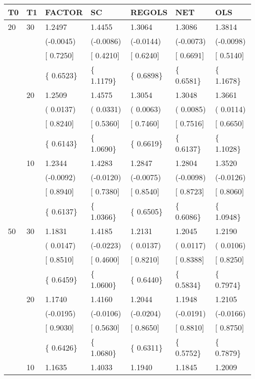 \begin{table}[ht]
\centering
\begin{tabular}{lllllll}
  \hline
T0 & T1 & FACTOR & SC & REGOLS & NET & OLS \\ 
  \hline
20 & 30 &  1.2497 &  1.4455 &  1.3064 &  1.3086 &  1.3814 \\ 
   &  & (-0.0045) & (-0.0086) & (-0.0144) & (-0.0073) & (-0.0098) \\ 
   &  & [ 0.7250] & [ 0.4210] & [ 0.6240] & [ 0.6691] & [ 0.5140] \\ 
   &  & \{ 0.6523\} & \{ 1.1179\} & \{ 0.6898\} & \{ 0.6581\} & \{ 1.1678\} \\ 
   & 20 &  1.2509 &  1.4575 &  1.3054 &  1.3048 &  1.3661 \\ 
   &  & ( 0.0137) & ( 0.0331) & ( 0.0063) & ( 0.0085) & ( 0.0114) \\ 
   &  & [ 0.8240] & [ 0.5360] & [ 0.7460] & [ 0.7516] & [ 0.6650] \\ 
   &  & \{ 0.6143\} & \{ 1.0690\} & \{ 0.6619\} & \{ 0.6137\} & \{ 1.1028\} \\ 
   & 10 &  1.2344 &  1.4283 &  1.2847 &  1.2804 &  1.3520 \\ 
   &  & (-0.0092) & (-0.0120) & (-0.0075) & (-0.0098) & (-0.0126) \\ 
   &  & [ 0.8940] & [ 0.7380] & [ 0.8540] & [ 0.8723] & [ 0.8060] \\ 
   &  & \{ 0.6137\} & \{ 1.0366\} & \{ 0.6505\} & \{ 0.6086\} & \{ 1.0948\} \\ 
  50 & 30 &  1.1831 &  1.4185 &  1.2131 &  1.2045 &  1.2190 \\ 
   &  & ( 0.0147) & (-0.0223) & ( 0.0137) & ( 0.0117) & ( 0.0106) \\ 
   &  & [ 0.8510] & [ 0.4600] & [ 0.8210] & [ 0.8388] & [ 0.8250] \\ 
   &  & \{ 0.6459\} & \{ 1.0600\} & \{ 0.6440\} & \{ 0.5834\} & \{ 0.7974\} \\ 
   & 20 &  1.1740 &  1.4160 &  1.2044 &  1.1948 &  1.2105 \\ 
   &  & (-0.0195) & (-0.0106) & (-0.0204) & (-0.0191) & (-0.0166) \\ 
   &  & [ 0.9030] & [ 0.5630] & [ 0.8650] & [ 0.8810] & [ 0.8750] \\ 
   &  & \{ 0.6426\} & \{ 1.0680\} & \{ 0.6311\} & \{ 0.5752\} & \{ 0.7879\} \\ 
   & 10 &  1.1635 &  1.4033 &  1.1940 &  1.1845 &  1.2009 \\ 

\end{tabular}
\end{table}
